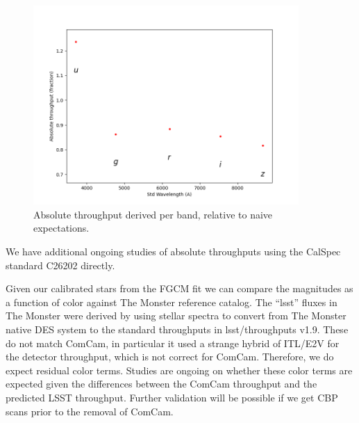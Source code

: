 \begin{figure}
  \begin{center}
    \includegraphics[width=0.9\textwidth]{photometric_calibration_figures/abs_throughput.png}
  \end{center}
  \caption{Absolute throughput derived per band, relative to naive expectations.}
  \label{fig:absthroughputs}
\end{figure}

We have additional ongoing studies of absolute throughputs using the CalSpec
standard C26202 directly.


Given our calibrated stars from the FGCM fit we can compare the magnitudes as a
function of color against The Monster reference catalog.  The ``lsst'' fluxes
in The Monster were derived by using stellar spectra to convert from The
Monster native DES system to the standard throughputs in lsst/throughputs
v1.9. These do not match ComCam, in particular it used a strange hybrid of
ITL/E2V for the detector throughput, which is not correct for
ComCam. Therefore, we do expect residual color terms.  Studies are ongoing on
whether these color terms are expected given the differences between the ComCam
throughput and the predicted LSST throughput.  Further validation will be
possible if we get CBP scans prior to the removal of ComCam.

